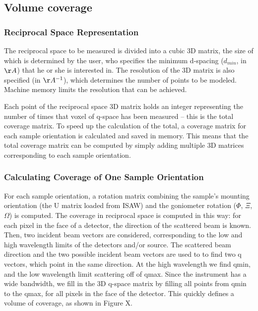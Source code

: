 \documentclass{iucr}              %
\begin{document}
  
\subsection{Volume coverage}

\subsubsection{Reciprocal Space Representation}

The reciprocal space to be measured is divided into a cubic 3D matrix, the size
of which is determined by the user, who specifies the minimum d-spacing
($d_{min}$, in $\AA$) that he or she is interested in. The resolution of the 3D
matrix is also specified (in $\AA^{-1}$), which determines the number of points to be
modeled. Machine memory limits the resolution that can be achieved.    

Each point of the reciprocal space 3D matrix holds an integer representing the 
number of times that voxel of q-space has been measured – this is the total
coverage matrix. To speed up the calculation of the total, a coverage matrix for
each sample orientation is calculated and saved in memory. This means that the
total coverage matrix can be computed by simply adding multiple 3D matrices
corresponding to each sample orientation. 
 
\subsubsection{Calculating Coverage of One Sample Orientation}


For each sample orientation, a rotation matrix combining the sample's mounting
orientation (the U matrix loaded from ISAW) and the goniometer rotation
($\Phi$, $\Xi$, $\Omega$) is computed. The coverage in reciprocal space is
computed in this way: for each pixel in the face of a detector, the direction of
the scattered beam is known. Then, two incident beam vectors are considered,
corresponding to the low and high wavelength limits of the detectors and/or
source. The scattered beam direction and the two possible incident beam vectors
are used to to find two q vectors, which point in the same direction. At the
high wavelength we find qmin, and the low wavelength limit scattering off of qmax.
Since the instrument has a wide bandwidth, we fill in the 3D q-space matrix by
filling all points from qmin to the  qmax, for all pixels in the face of the
detector. This quickly defines a volume of coverage, as shown in Figure X.  
\end{document}
